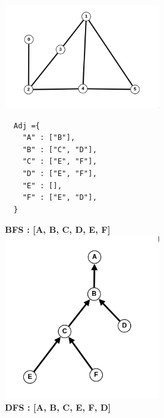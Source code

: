 \documentclass[12pt,twoside]{article}
\begin{document}


\begin{problems}

\problem  %

\begin{problemparts}
\problempart %
\includegraphics[width=0.5\textwidth]{./imgs/img1.png}
\problempart %
\hfill
\begin{lstlisting}
  Adj ={
    "A" : ["B"], 
    "B" : ["C", "D"],
    "C" : ["E", "F"],
    "D" : ["E", "F"],
    "E" : [],
    "F" : ["E", "D"],
  }
\end{lstlisting}
\newpage
\problempart %
\textbf{BFS : [A, B, C, D, E, F]} \\
\includegraphics[width=0.5\textwidth]{./imgs/img2.png} \\
\textbf{DFS : [A, B, C, E, F, D]} \\

\end{problemparts}
\end{problems}
\end{document}
